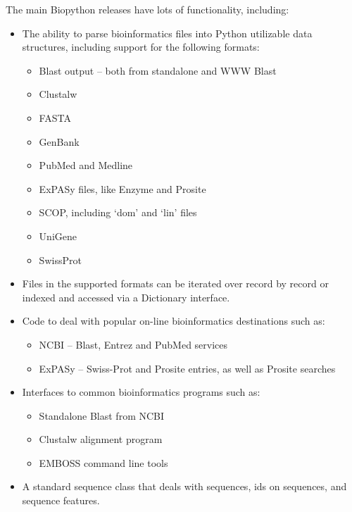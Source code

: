 \documentclass{report}
\begin{document}
The main Biopython releases have lots of functionality, including:

\begin{itemize}
  \item The ability to parse bioinformatics files into Python utilizable data structures, including support for the following formats:

  \begin{itemize}
    \item Blast output -- both from standalone and WWW Blast
    \item Clustalw
    \item FASTA
    \item GenBank
    \item PubMed and Medline
    \item ExPASy files, like Enzyme and Prosite
    \item SCOP, including `dom' and `lin' files
    \item UniGene
    \item SwissProt
  \end{itemize}

  \item Files in the supported formats can be iterated over record by record or indexed and accessed via a Dictionary interface.

  \item Code to deal with popular on-line bioinformatics destinations such as:

  \begin{itemize}
    \item NCBI -- Blast, Entrez and PubMed services
    \item ExPASy -- Swiss-Prot and Prosite entries, as well as Prosite searches
  \end{itemize}

  \item Interfaces to common bioinformatics programs such as:

  \begin{itemize}
    \item Standalone Blast from NCBI
    \item Clustalw alignment program
    \item EMBOSS command line tools
  \end{itemize}

  \item A standard sequence class that deals with sequences, ids on sequences, and sequence features.


\end{itemize}
\end{document}
